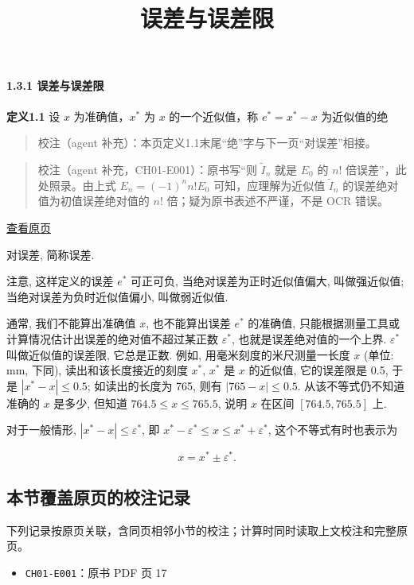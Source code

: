 \documentclass[
  10pt,
  fontset=fandol]{ctexart}
\title{误差与误差限}
\author{}
\date{}
\providecommand{\tightlist}{%
  \setlength{\itemsep}{0pt}\setlength{\parskip}{0pt}}
\begin{document}
\maketitle

\paragraph{1.3.1 误差与误差限}\label{ux8befux5deeux4e0eux8befux5deeux9650}

\textbf{定义1.1} 设 \(x\) 为准确值，\(x^*\) 为 \(x\) 的一个近似值，称 \(e^* = x^* - x\) 为近似值的绝

\begin{quote}
校注（agent 补充）：本页定义1.1末尾``绝''字与下一页``对误差''相接。
\end{quote}

\begin{quote}
校注（agent 补充，CH01-E001）：原书写``则 \(\tilde{I}_n\) 就是 \(E_0\) 的 \(n!\) 倍误差''，此处照录。由上式 \(E_n=(-1)^n n!E_0\) 可知，应理解为近似值 \(\tilde{I}_n\) 的误差绝对值为初值误差绝对值的 \(n!\) 倍；疑为原书表述不严谨，不是 OCR 错误。
\end{quote}

\href{../../source-images/pdf-018.jpeg}{查看原页}

对误差, 简称误差.

注意, 这样定义的误差 \(e^*\) 可正可负, 当绝对误差为正时近似值偏大, 叫做强近似值; 当绝对误差为负时近似值偏小, 叫做弱近似值.

通常, 我们不能算出准确值 \(x\), 也不能算出误差 \(e^*\) 的准确值, 只能根据测量工具或计算情况估计出误差的绝对值不超过某正数 \(\varepsilon^*\), 也就是误差绝对值的一个上界. \(\varepsilon^*\) 叫做近似值的误差限, 它总是正数. 例如, 用毫米刻度的米尺测量一长度 \(x\) (单位: mm, 下同), 读出和该长度接近的刻度 \(x^*\), \(x^*\) 是 \(x\) 的近似值, 它的误差限是 0.5, 于是 \(|x^* - x| \leqslant 0.5\); 如读出的长度为 765, 则有 \(|765 - x| \leqslant 0.5\). 从该不等式仍不知道准确的 \(x\) 是多少, 但知道 \(764.5 \leqslant x \leqslant 765.5\), 说明 \(x\) 在区间 \([764.5, 765.5]\) 上.

对于一般情形, \(|x^* - x| \leqslant \varepsilon^*\), 即 \(x^* - \varepsilon^* \leqslant x \leqslant x^* + \varepsilon^*\), 这个不等式有时也表示为

\[
x = x^* \pm \varepsilon^*.
\]

\subsection{本节覆盖原页的校注记录}\label{ux672cux8282ux8986ux76d6ux539fux9875ux7684ux6821ux6ce8ux8bb0ux5f55}

下列记录按原页关联，含同页相邻小节的校注；计算时同时读取上文校注和完整原页。

\begin{itemize}
\tightlist
\item
  \texttt{CH01-E001}：原书 PDF 页 17
\end{itemize}
\end{document}
